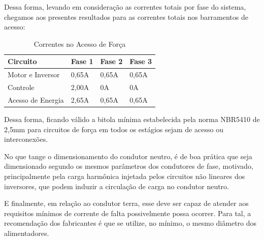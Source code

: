 Dessa forma, levando em consideração as correntes totais por fase do sistema, chegamos aos presentes resultados para as correntes totais nos barramentos de acesso:

    \begin{table}[h]
	\centering
	\label{tab01}
	
	\begin{tabular}{llll}
		\toprule
		\textbf{Circuito} & \textbf{Fase 1} & \textbf{Fase 2} & \textbf{Fase 3}\\
		\midrule
		Motor e Inversor & 0,65A & 0,65A & 0,65A \\
		Controle & 2,00A & 0A & 0A \\
        Acesso de Energia & 2,65A & 0,65A & 0,65A \\
		\bottomrule
	\end{tabular}

	\caption{Correntes no Acesso de Força}
\end{table}

Dessa forma, ficando válido a bitola mínima estabelecida pela norma NBR5410 de 2,5mm para circuitos de força em todos os estágios sejam de acesso ou interconexões. \cite{NBR5410}

No que tange o dimensionamento do condutor neutro, é de boa prática que seja dimensionado segundo os mesmos parâmetros dos condutores de fase, motivado, principalmente pela carga harmônica injetada pelos circuitos não lineares dos inversores, que podem induzir a circulação de carga no condutor neutro.

    E finalmente, em relação ao condutor terra, esse deve ser capaz de atender aos requisitos mínimos de corrente de falta possivelmente possa ocorrer. Para tal, a recomendação dos fabricantes é que se utilize, no mínimo, o mesmo diâmetro dos alimentadores.

    
    


     





